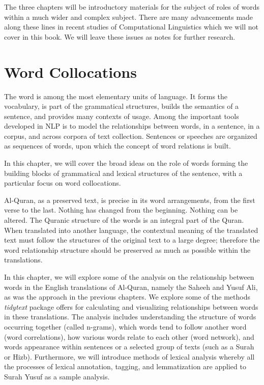 \documentclass[
]{article}
\begin{document}
The three chapters will be introductory materials for the subject of roles of words within a much wider and complex subject. There are many advancements made along these lines in recent studies of Computational Linguistics which we will not cover in this book. We will leave these issues as notes for further research.

\hypertarget{word-collocations}{%
\section{Word Collocations}\label{word-collocations}}

The word is among the most elementary units of language. It forms the vocabulary, is part of the grammatical structures, builds the semantics of a sentence, and provides many contexts of usage. Among the important tools developed in NLP is to model the relationships between words, in a sentence, in a corpus, and across corpora of text collection. Sentences or speeches are organized as sequences of words, upon which the concept of word relations is built.

In this chapter, we will cover the broad ideas on the role of words forming the building blocks of grammatical and lexical structures of the sentence, with a particular focus on word collocations.

Al-Quran, as a preserved text, is precise in its word arrangements, from the first verse to the last. Nothing has changed from the beginning. Nothing can be altered. The Quranic structure of the words is an integral part of the Quran. When translated into another language, the contextual meaning of the translated text must follow the structures of the original text to a large degree; therefore the word relationship structure should be preserved as much as possible within the translations.

In this chapter, we will explore some of the analysis on the relationship between words in the English translations of Al-Quran, namely the Saheeh and Yusuf Ali, as was the approach in the previous chapters. We explore some of the methods \emph{tidytext} \citep{tidytext} package offers for calculating and visualizing relationships between words in these translations. The analysis includes understanding the structure of words occurring together (called n-grams), which words tend to follow another word (word correlations), how various words relate to each other (word network), and words appearance within sentences or a selected group of texts (such as a Surah or Hizb). Furthermore, we will introduce methods of lexical analysis whereby all the processes of lexical annotation, tagging, and lemmatization are applied to Surah Yusuf as a sample analysis.
\end{document}
